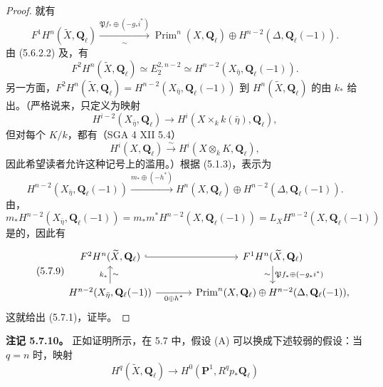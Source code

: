 \begin{proof}
就有
\begin{equation}\tag{5.7.6}F^1H^n(\widetilde X,\mathbf Q_\ell)\xrightarrow[\sim]{\mathfrak P f_*\oplus(-g_*i^*)}\operatorname{Prim}^n(X,\mathbf Q_\ell)\oplus H^{n-2}(\Delta,\mathbf Q_\ell(-1)).\end{equation}
由 (5.6.2.2) 及，有
\begin{equation}\tag{5.7.7}F^2H^n(\widetilde X,\mathbf Q_\ell)\simeq E_2^{2,n-2}\simeq H^{n-2}(X_{\bar\eta},\mathbf Q_\ell(-1)).\end{equation}
另一方面，$F^2H^n(\widetilde X,\mathbf Q_\ell)=H^{n-2}(X_{\bar\eta},\mathbf Q_\ell(-1))$ 到 $H^n(\widetilde X,\mathbf Q_\ell)$ 的由 $k_*$ 给出。（严格说来，只定义为映射
\[H^{i-2}(X_{\bar\eta},\mathbf Q_\ell)\longrightarrow H^i(X\times_k k(\bar\eta),\mathbf Q_\ell),\]
但对每个 $K/k$，都有（SGA 4 XII 5.4）
\[H^i(X,\mathbf Q_\ell)\xrightarrow{\sim}H^i(X\otimes_k K,\mathbf Q_\ell),\]
因此希望读者允许这种记号上的滥用。）根据 (5.1.3)，表示为
\begin{equation}\tag{5.7.8}H^{n-2}(X_{\bar\eta},\mathbf Q_\ell(-1))\xrightarrow{m_*\oplus(-h^*)}H^n(X,\mathbf Q_\ell)\oplus H^{n-2}(\Delta,\mathbf Q_\ell(-1)).\end{equation}
由，
\[m_*H^{n-2}(X_{\bar\eta},\mathbf Q_\ell(-1))=m_*m^*H^{n-2}(X,\mathbf Q_\ell(-1))=L_XH^{n-2}(X,\mathbf Q_\ell(-1))\]
是的，因此有
\begin{equation}\tag{5.7.9}
\begin{tikzcd}[column sep=large]
F^2H^n(\widetilde X,\mathbf Q_\ell)\arrow[r,hook]&F^1H^n(\widetilde X,\mathbf Q_\ell)\arrow[d,"{\mathfrak P f_*\oplus(-g_*i^*)}","\sim"']\\
H^{n-2}(X_{\bar\eta},\mathbf Q_\ell(-1))\arrow[u,"k_*","\sim"']\arrow[r,"{0\oplus h^*}"']&\operatorname{Prim}^n(X,\mathbf Q_\ell)\oplus H^{n-2}(\Delta,\mathbf Q_\ell(-1)),
\end{tikzcd}
\end{equation}
这就给出 (5.7.1)，证毕。
\end{proof}
\textbf{注记 5.7.10。} 正如证明所示，在 5.7 中，假设 (A) 可以换成下述较弱的假设：当 $q=n$ 时，映射
\begin{equation}\tag{5.7.11}H^q(\widetilde X,\mathbf Q_\ell)\longrightarrow H^0(\mathbf P^1,R^qp_*\mathbf Q_\ell)\end{equation}
